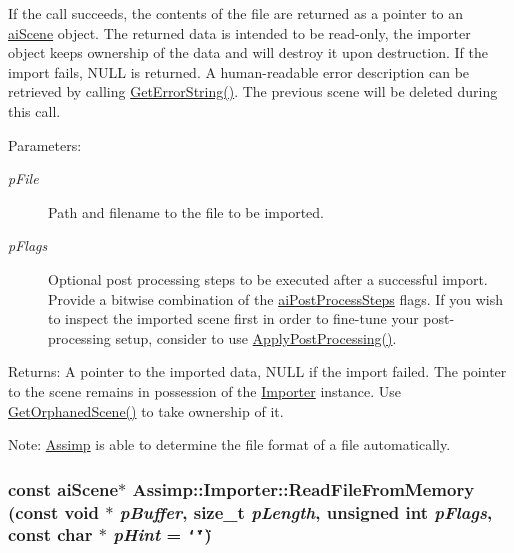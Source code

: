 If the call succeeds, the contents of the file are returned as a pointer to an \hyperlink{structai_scene}{aiScene} object. The returned data is intended to be read-only, the importer object keeps ownership of the data and will destroy it upon destruction. If the import fails, NULL is returned. A human-readable error description can be retrieved by calling \hyperlink{class_assimp_1_1_importer_23bab5ba8cb9b6886c690a610766668b}{GetErrorString()}. The previous scene will be deleted during this call. \begin{Desc}
\item[Parameters:]
\begin{description}
\item[{\em pFile}]Path and filename to the file to be imported. \item[{\em pFlags}]Optional post processing steps to be executed after a successful import. Provide a bitwise combination of the \hyperlink{postprocess_8h_64795260b95f5a4b3f3dc1be4f52e410}{aiPostProcessSteps} flags. If you wish to inspect the imported scene first in order to fine-tune your post-processing setup, consider to use \hyperlink{class_assimp_1_1_importer_5872e749c1451fee64183fc14f1fc81d}{ApplyPostProcessing()}. \end{description}
\end{Desc}
\begin{Desc}
\item[Returns:]A pointer to the imported data, NULL if the import failed. The pointer to the scene remains in possession of the \hyperlink{class_assimp_1_1_importer}{Importer} instance. Use \hyperlink{class_assimp_1_1_importer_60eb9042fb85bfbd61a863e131a56ecd}{GetOrphanedScene()} to take ownership of it.\end{Desc}
\begin{Desc}
\item[Note:]\hyperlink{namespace_assimp}{Assimp} is able to determine the file format of a file automatically. \end{Desc}
\hypertarget{class_assimp_1_1_importer_9b3c5e8b1042702f449e84a95b3324f6}{
\subsubsection[ReadFileFromMemory]{\setlength{\rightskip}{0pt plus 5cm}const {\bf aiScene}$\ast$ Assimp::Importer::ReadFileFromMemory (const void $\ast$ {\em pBuffer}, \/  size\_\-t {\em pLength}, \/  unsigned int {\em pFlags}, \/  const char $\ast$ {\em pHint} = {\tt \char`\"{}\char`\"{}})}}
\label{class_assimp_1_1_importer_9b3c5e8b1042702f449e84a95b3324f6}


